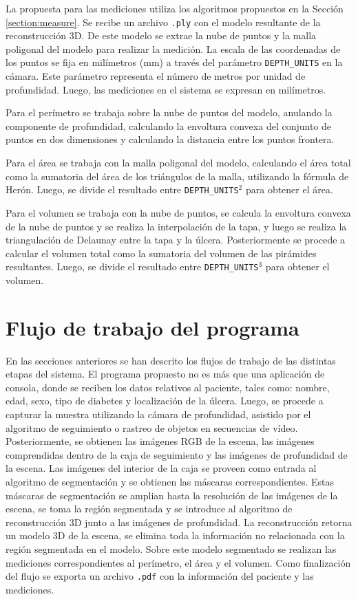 {La propuesta para las mediciones utiliza los algoritmos propuestos en la Sección \ref{section:measure}. Se recibe un archivo \texttt{.ply} con el modelo resultante de la reconstrucción 3D. De este modelo se extrae la nube de puntos y la malla poligonal del modelo para realizar la medición. La escala de las coordenadas de los puntos se fija en milímetros (mm) a través del parámetro \texttt{DEPTH\_UNITS} en la cámara. Este parámetro representa el número de metros por unidad de profundidad. Luego, las mediciones en el sistema se expresan en milímetros.

Para el perímetro se trabaja sobre la nube de puntos del modelo, anulando la componente de profundidad, calculando la envoltura convexa del conjunto de puntos en dos dimensiones y calculando la distancia entre los puntos frontera.

Para el área se trabaja con la malla poligonal del modelo, calculando el área total como la sumatoria del área de los triángulos de la malla, utilizando la fórmula de Herón. Luego, se divide el resultado entre \texttt{DEPTH\_UNITS}$^2$ para obtener el área.

Para el volumen se trabaja con la nube de puntos, se calcula la envoltura convexa de la nube de puntos y se realiza la interpolación de la tapa, y luego se realiza la triangulación de Delaunay entre la tapa y la úlcera. Posteriormente se procede a calcular el volumen total como la sumatoria del volumen de las pirámides resultantes. Luego, se divide el resultado entre \texttt{DEPTH\_UNITS}$^3$ para obtener el volumen. 


\section{Flujo de trabajo del programa}

En las secciones anteriores se han descrito los flujos de trabajo de las distintas etapas del sistema. El programa propuesto no es más que una aplicación de consola, donde se reciben los datos relativos al paciente, tales como: nombre, edad, sexo, tipo de diabetes y localización de la úlcera. Luego, se procede a capturar la muestra utilizando la cámara de profundidad, asistido por el algoritmo de seguimiento o rastreo de objetos en secuencias de vídeo. Posteriormente, se obtienen las imágenes RGB de la escena, las imágenes comprendidas dentro de la caja de seguimiento y las imágenes de profundidad de la escena. Las imágenes del interior de la caja se proveen como entrada al algoritmo de segmentación y se obtienen las máscaras correspondientes. Estas máscaras de segmentación se amplian hasta la resolución de las imágenes de la escena, se toma la región segmentada y se introduce al algoritmo de reconstrucción 3D junto a las imágenes de profundidad. La reconstrucción retorna un modelo 3D de la escena, se elimina toda la información no relacionada con la región segmentada en el modelo. Sobre este modelo segmentado se realizan las mediciones correspondientes al perímetro, el área y el volumen. Como finalización del flujo se exporta un archivo \verb|.pdf| con la información del paciente y las mediciones. 

}
